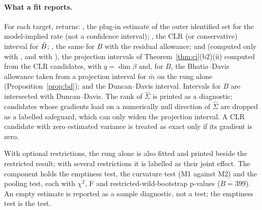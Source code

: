 \paragraph{What a fit reports.} For each target,  returns:
, the plug-in estimate of the outer identified set for the
model-implied rate (not a confidence interval); , the CLR (or
conservative) interval for $\tilde B$; , the same for $B$ with the
residual allowance;  and  (computed only with
, and  with ), the projection
intervals of Theorem~\ref{thm:ci}(b2)(ii) computed from the CLR candidates, with
$q=\dim\beta$ and, for $B$, the Bhatia--Davis allowance taken from a projection
interval for $\bar m$ on the rung alone (Proposition~\ref{prop:bd}); and the
Duncan--Davis interval. Intervals for $B$ are intersected with Duncan--Davis. The
rank of $\hat\Sigma$ is printed as a diagnostic; candidates whose gradients load on
a numerically null direction of $\hat\Sigma$ are dropped as a labelled safeguard,
which can only widen the projection interval. A CLR candidate with zero estimated
variance is treated as exact only if its gradient is zero.

With optional restrictions, the rung alone is also fitted and printed beside the
restricted result; with several restrictions it is labelled as their joint effect.
The  component holds the emptiness test, the curvature test (M1 against
M2) and the pooling test, each with $\chi^2$, F and restricted-wild-bootstrap
p-values ($B=399$). An empty estimate is reported as a sample diagnostic, not a
test; the emptiness test is the test.

